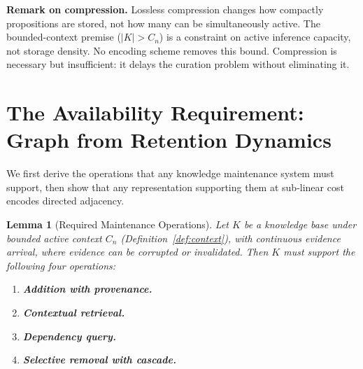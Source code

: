 \documentclass[11pt]{article}
\newtheorem{lemma}[theorem]{Lemma}
\theoremstyle{definition}
\begin{document}
\textbf{Remark on compression.} Lossless compression changes how
compactly propositions are stored, not how many can be simultaneously
active. The bounded-context premise ($|K| > C_n$) is a constraint on
active inference capacity, not storage density. No encoding scheme removes this bound. Compression is necessary
but insufficient: it delays the curation problem without eliminating
it.

\section{The Availability Requirement: Graph from Retention Dynamics}
\label{sec:dynamics}

We first derive the operations that any knowledge maintenance system
must support, then show that any representation supporting them
at sub-linear cost encodes directed adjacency.

\begin{lemma}[Required Maintenance Operations]
\label{lem:ops}
Let $K$ be a knowledge base under bounded active context $C_n$
(Definition~\ref{def:context}), with continuous evidence arrival, where
evidence can be corrupted or invalidated. Then $K$ must support the
following four operations:
\begin{enumerate}
\item[(i)] \textbf{Addition with provenance.}
\item[(ii)] \textbf{Contextual retrieval.}
\item[(iii)] \textbf{Dependency query.}
\item[(iv)] \textbf{Selective removal with cascade.}
\end{enumerate}
\end{lemma}
\end{document}
